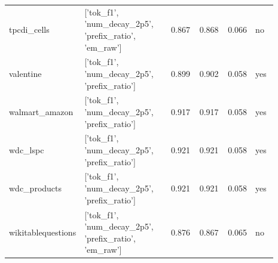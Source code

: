 \begin{longtable}{p{0.130\linewidth}p{0.364\linewidth}p{0.110\linewidth}p{0.110\linewidth}p{0.076\linewidth}p{0.096\linewidth}}
tpcdi\_\allowbreak{}cells & ['tok\_\allowbreak{}f1', 'num\_\allowbreak{}decay\_\allowbreak{}2p5', 'prefix\_\allowbreak{}ratio', 'em\_\allowbreak{}raw'] & 0.867 & 0.868 & 0.066 & no \\
valentine & ['tok\_\allowbreak{}f1', 'num\_\allowbreak{}decay\_\allowbreak{}2p5', 'prefix\_\allowbreak{}ratio'] & 0.899 & 0.902 & 0.058 & yes \\
walmart\_\allowbreak{}amazon & ['tok\_\allowbreak{}f1', 'num\_\allowbreak{}decay\_\allowbreak{}2p5', 'prefix\_\allowbreak{}ratio'] & 0.917 & 0.917 & 0.058 & yes \\
wdc\_\allowbreak{}lspc & ['tok\_\allowbreak{}f1', 'num\_\allowbreak{}decay\_\allowbreak{}2p5', 'prefix\_\allowbreak{}ratio'] & 0.921 & 0.921 & 0.058 & yes \\
wdc\_\allowbreak{}products & ['tok\_\allowbreak{}f1', 'num\_\allowbreak{}decay\_\allowbreak{}2p5', 'prefix\_\allowbreak{}ratio'] & 0.921 & 0.921 & 0.058 & yes \\
wikitablequestions & ['tok\_\allowbreak{}f1', 'num\_\allowbreak{}decay\_\allowbreak{}2p5', 'prefix\_\allowbreak{}ratio', 'em\_\allowbreak{}raw'] & 0.876 & 0.867 & 0.065 & no \\
\bottomrule
\end{longtable}
\normalsize
